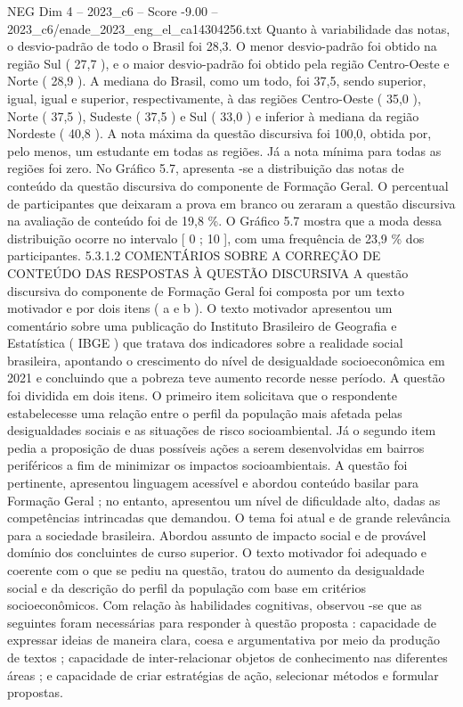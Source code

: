 \begin{textsample}{NEG Dim 4 – 2023\_c6 – Score -9.00 – 2023\_c6/enade\_2023\_eng\_el\_ca14304256.txt}
Quanto à variabilidade das notas, o desvio-padrão de todo o Brasil foi 28,3.
O menor desvio-padrão foi obtido na região Sul ( 27,7 ), e o maior desvio-padrão foi obtido pela região Centro-Oeste e Norte ( 28,9 ).
A mediana do Brasil, como um todo, foi 37,5, sendo superior, igual, igual e superior, respectivamente, à das regiões Centro-Oeste ( 35,0 ), Norte ( 37,5 ), Sudeste ( 37,5 ) e Sul ( 33,0 ) e inferior à mediana da região Nordeste ( 40,8 ).
A nota máxima da questão discursiva foi 100,0, obtida por, pelo menos, um estudante em todas as regiões.
Já a nota mínima para todas as regiões foi zero.
No Gráfico 5.7, apresenta -se a distribuição das notas de conteúdo da questão discursiva do componente de Formação Geral.
O percentual de participantes que deixaram a prova em branco ou zeraram a questão discursiva na avaliação de conteúdo foi de 19,8 \%.
O Gráfico 5.7 mostra que a moda dessa distribuição ocorre no intervalo [ 0 ; 10 ], com uma frequência de 23,9 \% dos participantes. 5.3.1.2 COMENTÁRIOS SOBRE A CORREÇÃO DE CONTEÚDO DAS RESPOSTAS À QUESTÃO DISCURSIVA A questão discursiva do componente de Formação Geral foi composta por um texto motivador e por dois itens ( a e b ).
O texto motivador apresentou um comentário sobre uma publicação do Instituto Brasileiro de Geografia e Estatística ( IBGE ) que tratava dos indicadores sobre a realidade social brasileira, apontando o crescimento do nível de desigualdade socioeconômica em 2021 e concluindo que a pobreza teve aumento recorde nesse período.
A questão foi dividida em dois itens.
O primeiro item solicitava que o respondente estabelecesse uma relação entre o perfil da população mais afetada pelas desigualdades sociais e as situações de risco socioambiental.
Já o segundo item pedia a proposição de duas possíveis ações a serem desenvolvidas em bairros periféricos a fim de minimizar os impactos socioambientais.
A questão foi pertinente, apresentou linguagem acessível e abordou conteúdo basilar para Formação Geral ; no entanto, apresentou um nível de dificuldade alto, dadas as competências intrincadas que demandou.
O tema foi atual e de grande relevância para a sociedade brasileira.
Abordou assunto de impacto social e de provável domínio dos concluintes de curso superior.
O texto motivador foi adequado e coerente com o que se pediu na questão, tratou do aumento da desigualdade social e da descrição do perfil da população com base em critérios socioeconômicos.
Com relação às habilidades cognitivas, observou -se que as seguintes foram necessárias para responder à questão proposta : capacidade de expressar ideias de maneira clara, coesa e argumentativa por meio da produção de textos ; capacidade de inter-relacionar objetos de conhecimento nas diferentes áreas ; e capacidade de criar estratégias de ação, selecionar métodos e formular propostas.

\end{textsample}
